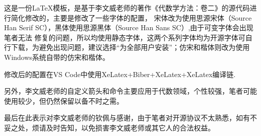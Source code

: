 这是一份\LaTeX 模板，是基于李文威老师的著作《代数学方法：卷二》的源代码进行简化修改的，主要是修改了一些字体的配置，
宋体改为使用思源宋体（Source Han Serif SC），黑体使用思源黑体（Source Han Sans SC）,由于可变字体会出现笔者无法
修复的问题，所以均使用静态字体，这两个系列字体均为开源字体可自行下载，为避免出现问题，建议选择“为全部用户安装”；仿宋和楷体则改为使用Windows系统自带的仿宋和楷体。\par
修改后的配置在VS Code中使用XeLatex+Biber+XeLatex+XeLatex编译链.\par
另外，李文威老师的自定义箭头和命令主要应用于代数领域，个性较强，笔者可能使用较少，但仍然保留以备不时之需。\par
最后在此表示对李文威老师的钦佩与感谢，由于笔者对开源协议不太熟悉，如有不妥之处，烦请及时告知，以免损害李文威老师或其它人的合法权益。